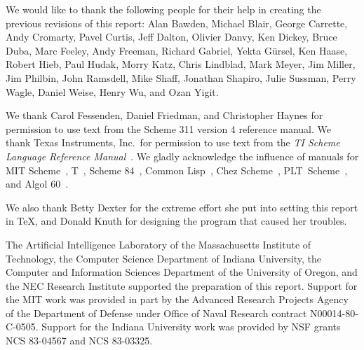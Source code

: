 We would like to thank the following people for their help in creating
the previous revisions of this report: Alan Bawden, Michael
Blair, George Carrette, Andy Cromarty, Pavel Curtis, Jeff Dalton, Olivier Danvy,
Ken Dickey, Bruce Duba, Marc Feeley,
Andy Freeman, Richard Gabriel, Yekta G\"ursel, Ken Haase, Robert
Hieb, Paul Hudak, Morry Katz, Chris Lindblad, Mark Meyer, Jim Miller, Jim Philbin,
John Ramsdell, Mike Shaff, Jonathan Shapiro, Julie Sussman,
Perry Wagle, Daniel Weise, Henry Wu, and Ozan Yigit.

We thank Carol Fessenden, Daniel
Friedman, and Christopher Haynes for permission to use text from the Scheme 311
version 4 reference manual.  We thank Texas Instruments, Inc.~for permission to
use text from the {\em TI Scheme Language Reference Manual}~\cite{TImanual85}.
We gladly acknowledge the influence of manuals for MIT Scheme~\cite{MITScheme},
T~\cite{Rees84}, Scheme 84~\cite{Scheme84}, Common Lisp~\cite{CLtL},
Chez Scheme~\cite{csug7}, PLT~Scheme~\cite{mzscheme352},
and Algol 60~\cite{Naur63}.

\vest We also thank Betty Dexter for the extreme effort she put into
setting this report in \TeX, and Donald Knuth for designing the program
that caused her troubles.

\vest The Artificial Intelligence Laboratory of the
Massachusetts Institute of Technology, the Computer Science
Department of Indiana University, the Computer and Information
Sciences Department of the University of Oregon, and the NEC Research
Institute supported the preparation of this report.  Support for the MIT
work was provided in part by
the Advanced Research Projects Agency of the Department of Defense under Office
of Naval Research contract N00014-80-C-0505.  Support for the Indiana
University work was provided by NSF grants NCS 83-04567 and NCS
83-03325.


